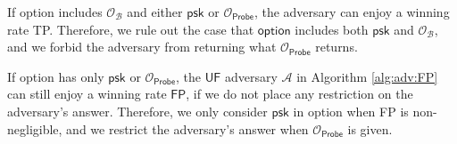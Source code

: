 If \textsf{option} includes $\mathcal{O}_\mathcal{B}$ and either $\textsf{psk}$ or $\mathcal{O}_\textsf{Probe}$, the adversary can enjoy a winning rate \textsf{TP}. Therefore, we rule out the case that $\textsf{option}$ includes both $\textsf{psk}$ and $\mathcal{O}_\mathcal{B}$, and we forbid the adversary from returning what $\mathcal{O}_\textsf{Probe}$ returns.


If \textsf{option} has only $\textsf{psk}$ or $\mathcal{O}_\textsf{Probe}$, the $\textsf{UF}$ adversary $\mathcal{A}$ in Algorithm \ref{alg:adv:FP} can still enjoy a winning rate $\textsf{FP}$, if we do not place any restriction on the adversary's answer. Therefore, we only consider $\textsf{psk}$ in \textsf{option} when \textsf{FP} is non-negligible, and we restrict the adversary's answer when $\mathcal{O}_\textsf{Probe}$ is given.
 


